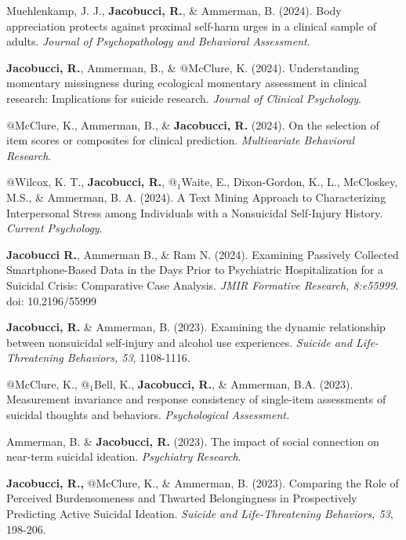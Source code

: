 \documentclass[letterpaper,10pt]{article}
\begin{document}
\begin{etaremune}
		\item Muehlenkamp, J. J., \textbf{Jacobucci, R.}, \& Ammerman, B. (2024). Body appreciation protects against proximal self-harm urges in a clinical sample of adults. \emph{Journal of Psychopathology and Behavioral Assessment}.
	
	\item \textbf{Jacobucci, R.}, Ammerman, B., \& $@$McClure, K. (2024). Understanding momentary missingness during ecological momentary assessment in clinical research: Implications for suicide research. \emph{Journal of Clinical Psychology}.
	
	
		\item $@$McClure, K., Ammerman, B., \&  \textbf{Jacobucci, R.} (2024). On the selection of item scores or composites for clinical prediction. \emph{Multivariate Behavioral Research}.
	
		\item $@$Wilcox, K. T., \textbf{Jacobucci, R.}, $@_1$Waite, E., Dixon-Gordon, K., L., McCloskey, M.S., \& Ammerman, B.
	A. (2024). A Text Mining Approach to Characterizing Interpersonal Stress among Individuals with a Nonsuicidal Self-Injury History. \emph{Current Psychology}.
	
	
	\item \textbf{Jacobucci R.}, Ammerman B., \& Ram N. (2024). Examining Passively Collected Smartphone-Based Data in the Days Prior to Psychiatric Hospitalization for a Suicidal Crisis: Comparative Case Analysis. \emph{JMIR Formative Research, 8:e55999}. doi: 10.2196/55999
	
		\item  \textbf{Jacobucci, R.} \& Ammerman, B. (2023). Examining the dynamic relationship between nonsuicidal self-injury and alcohol use experiences. \emph{Suicide and Life-Threatening Behaviors, 53}, 1108-1116.
		
				\item $@$McClure, K., $@_1$Bell, K., \textbf{Jacobucci, R.}, \& Ammerman, B.A. (2023). Measurement invariance
		and response consistency of single-item assessments of suicidal thoughts and behaviors. \emph{Psychological Assessment.}
		
		\item Ammerman, B. \& \textbf{Jacobucci, R.} (2023). The impact of social connection on near-term suicidal ideation. \emph{Psychiatry Research}.
	
\item \textbf{Jacobucci, R.,} $@$McClure, K.,  \& Ammerman, B. (2023). Comparing the Role of Perceived Burdensomeness and Thwarted Belongingness in Prospectively Predicting Active Suicidal Ideation. \emph{Suicide and Life-Threatening Behaviors, 53}, 198-206.
	

\end{etaremune}
\end{document}
